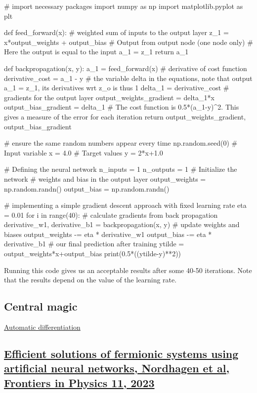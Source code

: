 \documentclass[%
oneside,                 %
final,                   %
10pt]{article}
\begin{document}
\bpycod
# import necessary packages
import numpy as np
import matplotlib.pyplot as plt

def feed_forward(x):
    # weighted sum of inputs to the output layer
    z_1 = x*output_weights + output_bias
    # Output from output node (one node only)
    # Here the output is equal to the input
    a_1 = z_1
    return a_1

def backpropagation(x, y):
    a_1 = feed_forward(x)
    # derivative of cost function
    derivative_cost = a_1 - y
    # the variable delta in the equations, note that output a_1 = z_1, its derivatives wrt z_o is thus 1
    delta_1 = derivative_cost
    # gradients for the output layer
    output_weights_gradient = delta_1*x
    output_bias_gradient = delta_1
    # The cost function is 0.5*(a_1-y)^2. This gives a measure of the error for each iteration
    return output_weights_gradient, output_bias_gradient

# ensure the same random numbers appear every time
np.random.seed(0)
# Input variable
x = 4.0
# Target values
y = 2*x+1.0

# Defining the neural network
n_inputs = 1
n_outputs = 1
# Initialize the network
# weights and bias in the output layer
output_weights = np.random.randn()
output_bias = np.random.randn()

# implementing a simple gradient descent approach with fixed learning rate
eta = 0.01
for i in range(40):
    # calculate gradients from back propagation
    derivative_w1, derivative_b1 = backpropagation(x, y)
    # update weights and biases
    output_weights -= eta * derivative_w1
    output_bias -= eta * derivative_b1
# our final prediction after training
ytilde = output_weights*x+output_bias
print(0.5*((ytilde-y)**2))


\epycod

Running this code gives us an acceptable results after some 40-50 iterations. Note that the results depend on the value of the learning rate.

\subsection{Central magic}

\href{{https://en.wikipedia.org/wiki/Automatic_differentiation}}{Automatic differentiation}

\subsection{\href{{https://doi.org/10.3389/fphy.2023.1061580}}{Efficient solutions of fermionic systems using artificial neural networks, Nordhagen et al, Frontiers in Physics 11, 2023}}
\end{document}
